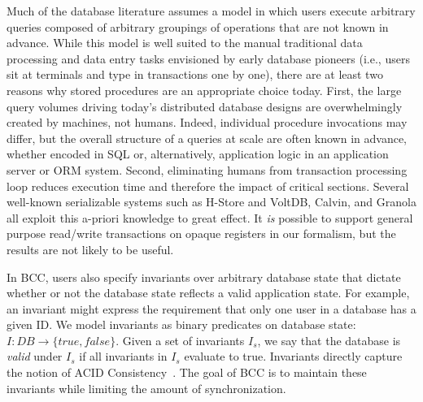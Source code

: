  Much of the database
literature assumes a model in which users execute arbitrary queries
composed of arbitrary groupings of operations that are not known in
advance. While this model is well suited to the manual traditional
data processing and data entry tasks envisioned by early database
pioneers (i.e., users sit at terminals and type in transactions one by
one), there are at least two reasons why stored procedures are an
appropriate choice today. First, the large query volumes driving
today's distributed database designs are overwhelmingly created by
machines, not humans. Indeed, individual procedure invocations may
differ, but the overall structure of a queries at scale are often
known in advance, whether encoded in SQL or, alternatively,
application logic in an application server or ORM system. Second,
eliminating humans from transaction processing loop reduces execution
time and therefore the impact of critical sections. Several well-known
serializable systems such as H-Store and VoltDB, Calvin, and Granola
all exploit this a-priori knowledge to great effect. It \textit{is}
possible to support general purpose read/write transactions on opaque
registers in our formalism, but the results are not likely to be
useful.\vspace{.5em}

 In BCC, users also specify invariants over
arbitrary database state that dictate whether or not the database
state reflects a valid application state. For example, an invariant
might express the requirement that only one user in a database has a
given ID.  We model invariants as binary predicates on database state:
$I: DB \rightarrow \{true, false\}$. Given a set of invariants $I_s$,
we say that the database is \textit{valid} under $I_s$ if all
invariants in $I_s$ evaluate to true. Invariants directly capture the
notion of ACID Consistency~\cite{bernstein-book}. The goal of BCC is
to maintain these invariants while limiting the amount of
synchronization.

